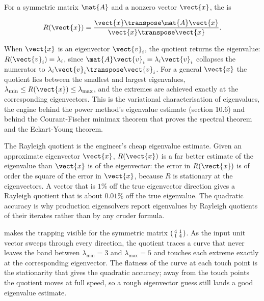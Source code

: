 For a symmetric matrix $\mat{A}$ and a nonzero vector $\vect{x}$,
the  is

\[
R(\vect{x}) = \frac{\vect{x}\transpose \mat{A} \vect{x}}
{\vect{x}\transpose \vect{x}}.
\]

When $\vect{x}$ is an eigenvector $\vect{v}_{i}$, the quotient
returns the eigenvalue: $R(\vect{v}_{i}) = \lambda_{i}$, since
$\mat{A} \vect{v}_{i} = \lambda_{i} \vect{v}_{i}$ collapses the
numerator to $\lambda_{i} \vect{v}_{i}\transpose \vect{v}_{i}$. For
a general $\vect{x}$ the quotient lies between the smallest and
largest eigenvalues, $\lambda_{\min} \leq R(\vect{x}) \leq
\lambda_{\max}$, and the extremes are achieved exactly at the
corresponding eigenvectors. This is the variational characterisation
of eigenvalues, the engine behind the power method's eigenvalue
estimate (section 10.6) and behind the Courant-Fischer minimax
theorem that proves the spectral theorem and the Eckart-Young
theorem.

The Rayleigh quotient is the engineer's cheap eigenvalue estimate.
Given an approximate eigenvector $\vect{x}$, $R(\vect{x})$ is a far
better estimate of the eigenvalue than $\vect{x}$ is of the
eigenvector: the error in $R(\vect{x})$ is of order the square of
the error in $\vect{x}$, because $R$ is stationary at the
eigenvectors. A vector that is $1\%$ off the true eigenvector
direction gives a Rayleigh quotient that is about $0.01\%$ off the
true eigenvalue. The quadratic accuracy is why production
eigensolvers report eigenvalues by Rayleigh quotients of their
iterates rather than by any cruder formula.



 makes the trapping visible for
the symmetric matrix $\begin{psmallmatrix} 4 & 1 \\ 1 & 4
\end{psmallmatrix}$. As the input unit vector sweeps through every
direction, the quotient traces a curve that never leaves the band
between $\lambda_{\min} = 3$ and $\lambda_{\max} = 5$ and touches each
extreme exactly at the corresponding eigenvector. The flatness of the
curve at each touch point is the stationarity that gives the quadratic
accuracy; away from the touch points the quotient moves at full speed,
so a rough eigenvector guess still lands a good eigenvalue estimate.

